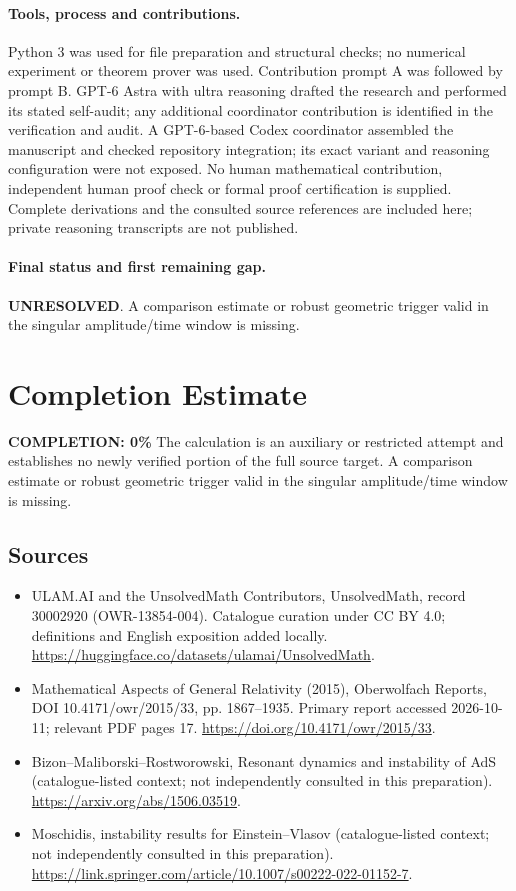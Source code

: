 \documentclass[11pt]{article}
\begin{document}
\paragraph{Tools, process and contributions.}
Python 3 was used for file preparation and structural checks; no numerical experiment or theorem prover was used. Contribution prompt A was followed by prompt B. GPT-6 Astra with ultra reasoning drafted the research and performed its stated self-audit; any additional coordinator contribution is identified in the verification and audit. A GPT-6-based Codex coordinator assembled the manuscript and checked repository integration; its exact variant and reasoning configuration were not exposed. No human mathematical contribution, independent human proof check or formal proof certification is supplied. Complete derivations and the consulted source references are included here; private reasoning transcripts are not published.

\paragraph{Final status and first remaining gap.}
\textbf{UNRESOLVED}. A comparison estimate or robust geometric trigger valid in the singular amplitude/time window is missing.

\section{Completion Estimate}
\noindent\textbf{COMPLETION: 0\%}
The calculation is an auxiliary or restricted attempt and establishes no newly verified portion of the full source target. A comparison estimate or robust geometric trigger valid in the singular amplitude/time window is missing.

\subsection{Sources}
\begin{itemize}
\item[\hypertarget{source:30002920:1}{S1}] ULAM.AI and the UnsolvedMath Contributors, UnsolvedMath, record 30002920 (OWR-13854-004). Catalogue curation under CC BY 4.0; definitions and English exposition added locally.
\url{https://huggingface.co/datasets/ulamai/UnsolvedMath}.
\item[\hypertarget{source:30002920:2}{S2}] Mathematical Aspects of General Relativity (2015), Oberwolfach Reports, DOI 10.4171/owr/2015/33, pp. 1867--1935. Primary report accessed 2026-10-11; relevant PDF pages 17.
\url{https://doi.org/10.4171/owr/2015/33}.
\item[\hypertarget{source:30002920:3}{S3}] Bizon--Maliborski--Rostworowski, Resonant dynamics and instability of AdS (catalogue-listed context; not independently consulted in this preparation).
\url{https://arxiv.org/abs/1506.03519}.
\item[\hypertarget{source:30002920:4}{S4}] Moschidis, instability results for Einstein--Vlasov (catalogue-listed context; not independently consulted in this preparation).
\url{https://link.springer.com/article/10.1007/s00222-022-01152-7}.
\end{itemize}
\label{end:30002920}
\end{document}
